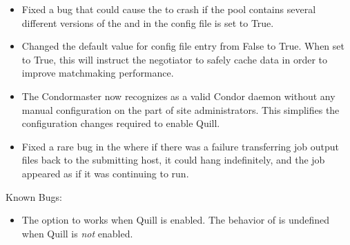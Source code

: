 \begin{itemize}
\item Fixed a bug that could cause the  to crash if the
pool contains several different versions of the  and in the
config file  is set to True.

\item Changed the default value for config file entry
 from False to True.  When set to
True, this will instruct the negotiator to safely cache data in order to
improve matchmaking performance.

\item The Condor{master} now recognizes  as a valid
  Condor daemon without any manual configuration on the part of site
  administrators.
  This simplifies the configuration changes required to enable Quill. 

\item Fixed a rare bug in the  where if there was a
  failure transferring job output files back to the submitting host,
  it could hang indefinitely, and the job appeared as if it was
  continuing to run.

\end{itemize}


\noindent Known Bugs:

\begin{itemize}

\item The  option to  works
when Quill is enabled.  The behavior of 
 is undefined when Quill is \emph{not}
enabled.

\end{itemize}

